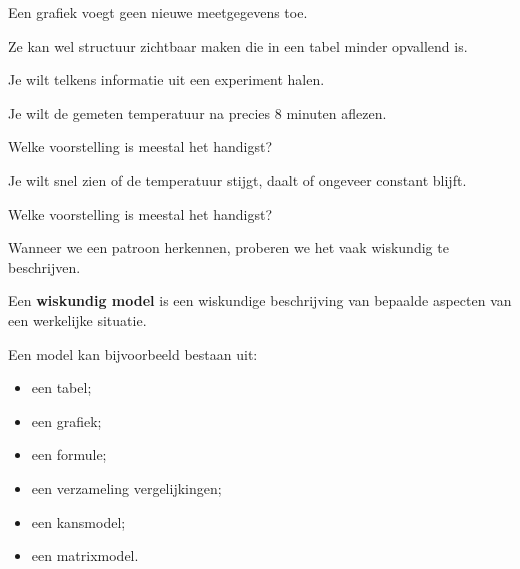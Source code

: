 \documentclass{ximera}
\begin{document}
\begin{opmerking}
Een grafiek voegt geen nieuwe meetgegevens toe.

Ze kan wel structuur zichtbaar maken die in een tabel minder
opvallend is.
\end{opmerking}



\begin{oefening}{\oefB}

Je wilt telkens informatie uit een experiment halen.

\begin{question}
Je wilt de gemeten temperatuur na precies $8$ minuten aflezen.

Welke voorstelling is meestal het handigst?

\begin{multipleChoice}
\end{multipleChoice}
\end{question}

\begin{question}
Je wilt snel zien of de temperatuur stijgt, daalt of ongeveer constant
blijft.

Welke voorstelling is meestal het handigst?

\begin{multipleChoice}
\end{multipleChoice}
\end{question}

\end{oefening}




Wanneer we een patroon herkennen, proberen we het vaak wiskundig te
beschrijven.

\begin{definitie}

Een \textbf{wiskundig model} is een wiskundige beschrijving van
bepaalde aspecten van een werkelijke situatie.

Een model kan bijvoorbeeld bestaan uit:

\begin{itemize}
  \item een tabel;
  \item een grafiek;
  \item een formule;
  \item een verzameling vergelijkingen;
  \item een kansmodel;
  \item een matrixmodel.
\end{itemize}

\end{definitie}
\end{document}
